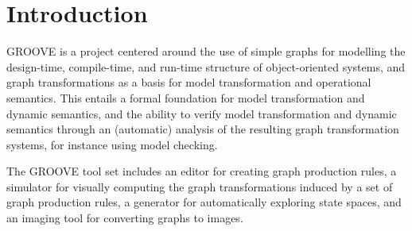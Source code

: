 \section{Introduction}

GROOVE is a project centered around the use of simple graphs for modelling the design-time, compile-time, and run-time structure of object-oriented systems, and graph transformations as a basis for model transformation and operational semantics. This entails a formal foundation for  model transformation and dynamic semantics, and the ability to verify model transformation and dynamic semantics through an (automatic) analysis of the resulting graph transformation systems, for instance using model checking.

The GROOVE tool set includes an editor for creating graph production rules, a simulator for visually computing the graph transformations
induced by a set of graph production rules, a generator for automatically exploring state spaces, and an imaging tool for converting graphs to images.
